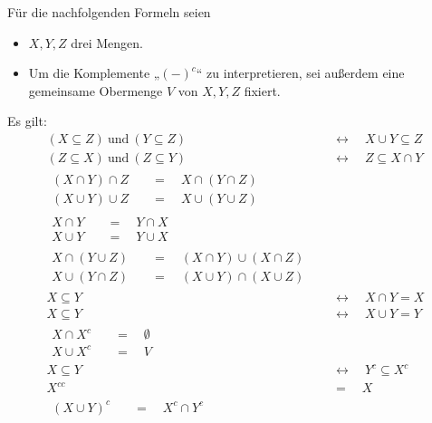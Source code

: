 Für die nachfolgenden Formeln seien
\begin{itemize}
    \item $X,Y,Z$ drei Mengen.
    \item Um die Komplemente „$(-)^c$“ zu interpretieren, sei außerdem eine gemeinsame Obermenge $V$ von $X,Y,Z$ fixiert.
\end{itemize}
Es gilt:
\begingroup
\allowdisplaybreaks
\begin{align*}
    (X\subseteq Z) \ \text{und}\ (Y\subseteq Z)  & \quad \leftrightarrow\quad X\cup Y \subseteq Z  \\
    (Z\subseteq X) \ \text{und}\ (Z\subseteq Y) & \quad \leftrightarrow\quad Z \subseteq X\cap Y  \\[0.8em]
    \begin{split}
        (X \cap Y) \cap Z &  \quad = \quad  X \cap (Y \cap Z) \\
        (X \cup Y) \cup Z &  \quad = \quad  X \cup (Y \cup Z)
    \end{split} \tag{Assoziativgesetze} \\[0.8em]
    \begin{split}
        X \cap Y &  \quad = \quad  Y\cap X \\
        X \cup Y &  \quad = \quad  Y\cup X
    \end{split} \tag{Kommutativgesetze} \\[0.8em]
    \begin{split}
        X \cap (Y \cup Z) &  \quad = \quad  (X\cap Y) \cup (X\cap Z) \\
        X \cup (Y\cap Z) &  \quad = \quad  (X\cup Y) \cap (X\cup Z)
    \end{split} \tag{Distributivgesetze} \\[0.8em]
    X \subseteq Y & \quad \leftrightarrow\quad X\cap Y  =  X \\
    X \subseteq Y & \quad \leftrightarrow\quad X\cup Y = Y \\[0.8em]
    \begin{split}
        X \cap X^c & \quad = \quad  \emptyset \\
        X \cup X^c & \quad = \quad  V
    \end{split} \tag{Komplementgleichungen} \\[0.8em]
    X \subseteq Y & \quad \leftrightarrow\quad Y^c \subseteq X^c \\
    X^{cc} &  \quad = \quad  X \\[0.8em]
    \begin{split}
        (X\cup Y)^c &  \quad = \quad  X^c \cap Y^c \\

\end{split}
\end{align*}
